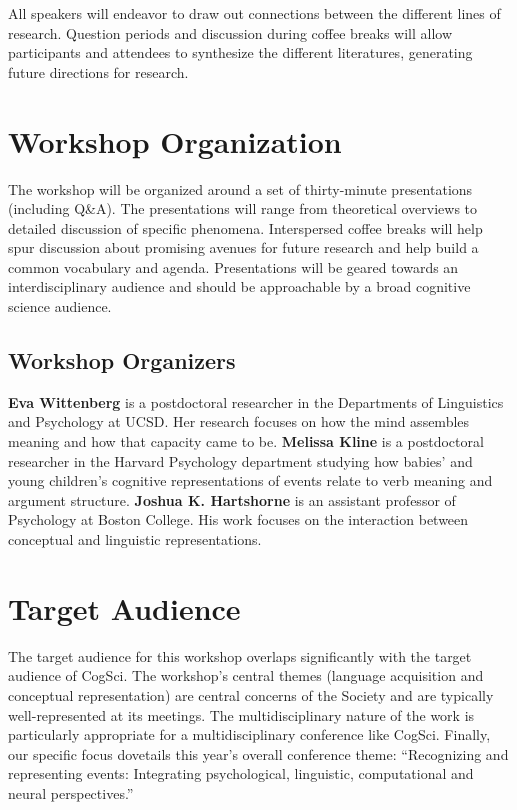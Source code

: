 \documentclass[10pt,letterpaper]{article}
\begin{document}
All speakers will endeavor to draw out connections between the
different lines of research. Question periods and discussion during
coffee breaks will allow participants and attendees
to synthesize the different literatures, generating future directions
for research.

\section{Workshop Organization}

The workshop will be organized around a set of thirty-minute
presentations (including Q\&A). The presentations will range from
theoretical overviews to detailed discussion of specific
phenomena. Interspersed coffee breaks will help spur discussion about
promising avenues for future research and help build a common
vocabulary and agenda. Presentations will be geared towards an
interdisciplinary audience and should be approachable by a broad
cognitive science audience.

\subsection{Workshop Organizers}

\textbf{Eva Wittenberg} is a postdoctoral researcher in the
Departments of Linguistics and Psychology at UCSD. Her research
focuses on how the mind assembles meaning and how that capacity came
to be. \textbf{Melissa Kline} is a postdoctoral researcher in the Harvard Psychology department studying how babies' and young children's cognitive representations of events relate to verb meaning and argument structure.
\textbf{Joshua K. Hartshorne} is an assistant professor of
Psychology at Boston College. His work focuses on the interaction
between conceptual and linguistic representations.

\section{Target Audience}

The target audience for this workshop overlaps significantly
with the target audience of CogSci. The workshop's central themes
(language acquisition and conceptual representation) are central concerns of the Society and are typically well-represented at
its meetings. The multidisciplinary nature of the work is particularly
appropriate for a multidisciplinary conference like CogSci. Finally,
our specific focus dovetails this year's overall conference theme: ``Recognizing and
representing events: Integrating psychological, linguistic,
computational and neural perspectives.''
\end{document}
